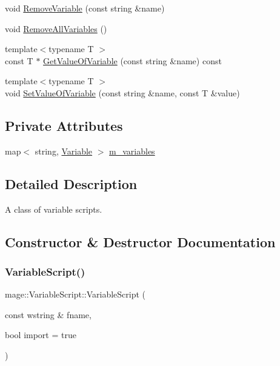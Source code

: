 \begin{DoxyCompactItemize}
\item 
void \hyperlink{classmage_1_1_variable_script_a4970ef4faafb1a6a43c4648ec9f36cce}{Remove\+Variable} (const string \&name)
\item 
void \hyperlink{classmage_1_1_variable_script_ac9575fb5f2ca445d9bcf23b63d00124e}{Remove\+All\+Variables} ()
\item 
{\footnotesize template$<$typename T $>$ }\\const T $\ast$ \hyperlink{classmage_1_1_variable_script_a231b83e1e32b882489ed90faa69f7137}{Get\+Value\+Of\+Variable} (const string \&name) const
\item 
{\footnotesize template$<$typename T $>$ }\\void \hyperlink{classmage_1_1_variable_script_a309360848e9261773b1c6e9f8dcee7a1}{Set\+Value\+Of\+Variable} (const string \&name, const T \&value)
\end{DoxyCompactItemize}
\subsection*{Private Attributes}
\begin{DoxyCompactItemize}
\item 
map$<$ string, \hyperlink{structmage_1_1_variable}{Variable} $>$ \hyperlink{classmage_1_1_variable_script_a18e5571793e4399e989c533409dd5ac3}{m\+\_\+variables}
\end{DoxyCompactItemize}


\subsection{Detailed Description}
A class of variable scripts. 

\subsection{Constructor \& Destructor Documentation}
\hypertarget{classmage_1_1_variable_script_a4b4028a9710fcfc5fb26bb63922a90cb}{}\label{classmage_1_1_variable_script_a4b4028a9710fcfc5fb26bb63922a90cb} 
\subsubsection{\texorpdfstring{Variable\+Script()}{VariableScript()}\hspace{0.1cm}{\footnotesize\ttfamily [1/3]}}
{\footnotesize\ttfamily mage\+::\+Variable\+Script\+::\+Variable\+Script (\begin{DoxyParamCaption}\item[{const wstring \&}]{fname,  }\item[{bool}]{import = {\ttfamily true} }\end{DoxyParamCaption})\hspace{0.3cm}{\ttfamily [explicit]}}

